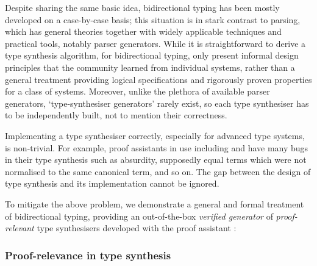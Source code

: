 
Despite sharing the same basic idea, bidirectional typing has been mostly developed on a case-by-case basis; this situation is in stark contrast to parsing, which has general theories together with widely applicable techniques and practical tools, notably parser generators.
While it is straightforward to derive a type synthesis algorithm,
for bidirectional typing, \citeauthor{Dunfield2021} only present informal design principles that the community learned from individual systems, rather than a general treatment providing logical specifications and rigorously proven properties for a class of systems.
Moreover, unlike the plethora of available parser generators, `type-synthesiser generators' rarely exist, so each type synthesiser has to be independently built, not to mention their correctness.

Implementing a type synthesiser correctly, especially for advanced type systems, is non-trivial.
For example, proof assistants in use including \Coq and \Agda have many bugs in their type synthesis such as absurdity, supposedly equal terms which were not normalised to the same canonical term, and so on.
The gap between the design of type synthesis and its implementation cannot be ignored.

To mitigate the above problem, we demonstrate a general and formal treatment of bidirectional typing, providing an out-of-the-box \emph{verified generator} of \emph{proof-relevant} type synthesisers developed with the proof assistant \Agda:

\subsubsection{Proof-relevance in type synthesis}
\label{sec:PLFA}


